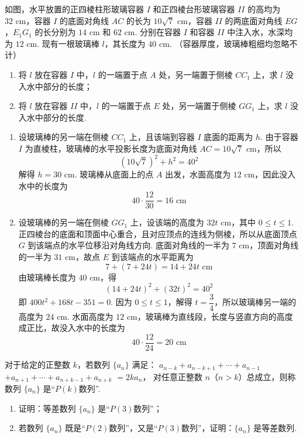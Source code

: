 \begin{problem}
如图，水平放置的正四棱柱形玻璃容器 \(I\) 和正四棱台形玻璃容器 \(II\) 的高均为 \(32\text{ cm}\)，容器 \(I\) 的底面对角线 \(AC\) 的长为 \(10\sqrt7\text{ cm}\)，容器 \(II\) 的两底面对角线 \(EG\)，\(E_1G_1\) 的长分别为 \(14\text{ cm}\) 和 \(62\text{ cm}\). 分别在容器 \(I\) 和容器 \(II\) 中注入水，水深均为 \(12\text{ cm}\). 现有一根玻璃棒 \(l\)，其长度为 \(40\text{ cm}\). （容器厚度，玻璃棒粗细均忽略不计）

\begin{enumerate}
\item 将 \(l\) 放在容器 \(I\) 中，\(l\) 的一端置于点 \(A\) 处，另一端置于侧棱 \(CC_1\) 上，求 \(l\) 没入水中部分的长度；
\item 将 \(l\) 放在容器 \(II\) 中，\(l\) 的一端置于点 \(E\) 处，另一端置于侧棱 \(GG_1\) 上，求 \(l\) 没入水中部分的长度.
\end{enumerate}

\end{problem}

\begin{solution}
\begin{enumerate}
\item 设玻璃棒的另一端在侧棱 \(CC_1\) 上，且该端到容器 \(I\) 底面的距离为 \(h\). 由于容器 \(I\) 为直棱柱，玻璃棒的水平投影长度为底面对角线 \(AC=10\sqrt7\text{ cm}\)，所以
\[
(10\sqrt7)^2+h^2=40^2
\]
解得 \(h=30\text{ cm}\). 玻璃棒从底面上的点 \(A\) 出发，水面高度为 \(12\text{ cm}\)，因此没入水中的长度为
\[
40\cdot\dfrac{12}{30}=16\text{ cm}
\]
\item 设玻璃棒的另一端在侧棱 \(GG_1\) 上，设该端的高度为 \(32t\text{ cm}\)，其中 \(0\le t\le1\). 正四棱台的底面和顶面中心重合，且对应顶点的连线为侧棱，所以从底面顶点 \(G\) 到该端点的水平位移沿对角线方向. 底面对角线的一半为 \(7\text{ cm}\)，顶面对角线的一半为 \(31\text{ cm}\)，故点 \(E\) 到该端点的水平距离为
\[
7+(7+24t)=14+24t\text{ cm}
\]
由玻璃棒长度为 \(40\text{ cm}\)，得
\[
(14+24t)^2+(32t)^2=40^2
\]
即 \(400t^2+168t-351=0\). 因为 \(0\le t\le1\)，解得 \(t=\dfrac34\)，所以玻璃棒另一端的高度为 \(24\text{ cm}\). 水面高度为 \(12\text{ cm}\)，玻璃棒为直线段，长度与竖直方向的高度成正比，故没入水中的长度为
\[
40\cdot\dfrac{12}{24}=20\text{ cm}
\]
\end{enumerate}
\end{solution}


\begin{problem}
对于给定的正整数 \(k\)，若数列 \(\{a_n\}\) 满足：
\(a_{n-k}+a_{n-k+1}+\allowbreak\cdots+\allowbreak a_{n-1}\)\allowbreak
\(+a_{n+1}+\allowbreak\cdots+\allowbreak a_{n+k-1}+a_{n+k}\)\allowbreak
\(=2ka_n\)，
对任意正整数 \(n\)（\(n>k\)）总成立，则称数列 \(\{a_n\}\) 是“\(P(k)\)数列”.

\begin{enumerate}
\item 证明：等差数列 \(\{a_n\}\) 是“\(P(3)\)数列”；
\item 若数列 \(\{a_n\}\) 既是“\(P(2)\)数列”，又是“\(P(3)\)数列”，证明：\(\{a_n\}\) 是等差数列.
\end{enumerate}
\end{problem}

